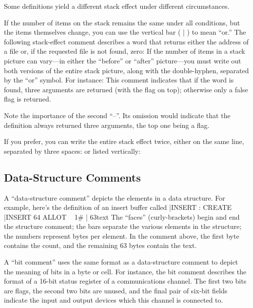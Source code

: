 Some definitions yield a different stack effect under different circumstances.

If the number of items on the stack remains the same under all conditions,
but the items themselves change, you can use the vertical bar ( | )
to mean ``or.'' The following stack-effect comment describes a word that
returns either the address of a file or, if the requested file is not found,
zero:
If the number of items in a stack picture can vary---in either the ``before''
or ``after'' picture---you must write out both versions of the entire stack
picture, along with the double-hyphen, separated by the ``or'' symbol.  For
instance:
This comment indicates that if the word is found, three arguments are
returned (with the flag on top); otherwise only a false flag is returned.

Note the importance of the second ``--''.  Its omission would indicate
that the definition always returned three arguments, the top one being a
flag.

If you prefer, you can write the entire stack effect twice, either on
the same line, separated by three spaces:
or listed vertically:
\subsection{Data-Structure Comments}

A ``data-structure comment'' depicts the elements in a data structure.
For example, here's the definition of an insert buffer called |INSERT :
CREATE |INSERT  64 ALLOT  \  { 1# | 63text }
The ``faces'' (curly-brackets) begin and end the structure comment; the
bars separate the various elements in the structure; the numbers represent
bytes per element.  In the comment above, the first byte contains the
count, and the remaining 63 bytes contain the text.

A ``bit comment'' uses the same format as a data-structure comment
to depict the meaning of bits in a byte or cell.  For instance, the bit
comment
describes the format of a 16-bit status register of a communications channel.
The first two bits are flags, the second two bits are unused, and the
final pair of six-bit fields indicate the input and output devices which this
channel is connected to.

